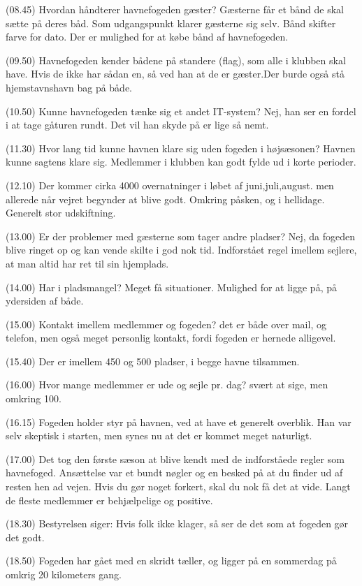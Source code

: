 \documentclass{article}
\begin{document}
(08.45) Hvordan håndterer havnefogeden gæster? Gæsterne får et bånd de skal sætte på deres båd. Som udgangspunkt klarer gæsterne sig selv. Bånd skifter farve for dato. Der er mulighed for at købe bånd af havnefogeden.

(09.50) Havnefogeden kender bådene på standere (flag), som alle i klubben skal have. Hvis de ikke har sådan en, så ved han at de er gæster.Der burde også stå hjemstavnshavn bag på både. 

(10.50) Kunne havnefogeden tænke sig et andet IT-system? Nej, han ser en fordel i at tage gåturen rundt. Det vil han skyde på er lige så nemt. 

(11.30) Hvor lang tid kunne havnen klare sig uden fogeden i højsæsonen? Havnen kunne sagtens klare sig. Medlemmer i klubben kan godt fylde ud i korte perioder.

(12.10) Der kommer cirka 4000 overnatninger i løbet af juni,juli,august. men allerede når vejret begynder at blive godt. Omkring påsken, og i hellidage. Generelt stor udskiftning.

(13.00) Er der problemer med gæsterne som tager andre pladser? Nej, da fogeden blive ringet op og kan vende skilte i god nok tid. Indforstået regel imellem sejlere, at man altid har ret til sin hjemplads.

(14.00) Har i pladsmangel? Meget få situationer. Mulighed for at ligge på, på ydersiden af både.

(15.00) Kontakt imellem medlemmer og fogeden? det er både over mail, og telefon, men også meget personlig kontakt, fordi fogeden er hernede alligevel.

(15.40) Der er imellem 450 og 500 pladser, i begge havne tilsammen.

(16.00) Hvor mange medlemmer er ude og sejle pr. dag? svært at sige, men omkring 100.

(16.15) Fogeden holder styr på havnen, ved at have et generelt overblik. Han var selv skeptisk i starten, men synes nu at det er kommet meget naturligt.

(17.00) Det tog den første sæson at blive kendt med de indforståede regler som havnefoged. Ansættelse var et bundt nøgler og en besked på at du finder ud af resten hen ad vejen. Hvis du gør noget forkert, skal du nok få det at vide. Langt de fleste medlemmer er behjælpelige og positive.

(18.30) Bestyrelsen siger: Hvis folk ikke klager, så ser de det som at fogeden gør det godt.

(18.50) Fogeden har gået med en skridt tæller, og ligger på en sommerdag på omkrig 20 kilometers gang.
\end{document}
